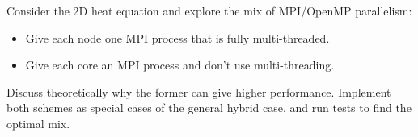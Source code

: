 \begin{exercise}
Consider the 2D heat equation and explore the mix of MPI/OpenMP
parallelism:
\begin{itemize}
\item Give each node one MPI process that is fully multi-threaded.
\item Give each core an MPI process and don't use multi-threading.
\end{itemize}
Discuss theoretically why the former can give higher performance.
Implement both schemes as special cases of the general hybrid case,
and run tests to find the optimal mix.
\end{exercise}


